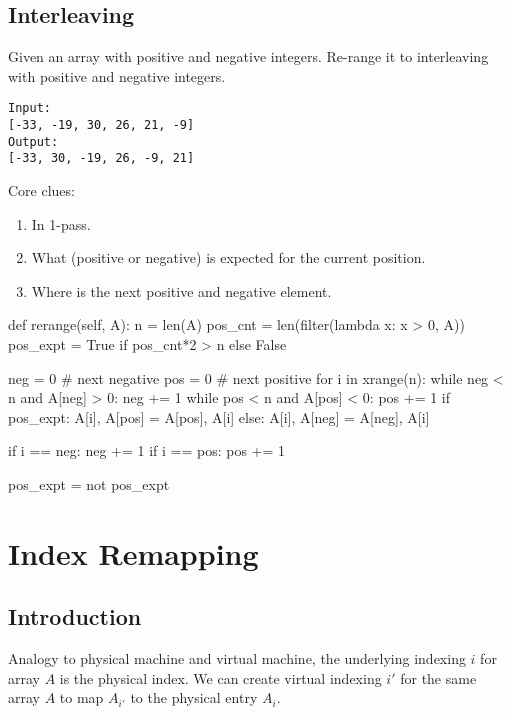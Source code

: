 \subsection{Interleaving}
 Given an array with positive and negative integers. Re-range it to interleaving with positive and negative integers.
\begin{lstlisting}
Input:
[-33, -19, 30, 26, 21, -9]
Output:
[-33, 30, -19, 26, -9, 21]
\end{lstlisting}
Core clues:
\begin{enumerate}
\item In 1-pass.
\item What (positive or negative) is expected for the current position.
\item Where is the next positive and negative element.
\end{enumerate}
\begin{python}
def rerange(self, A):
    n = len(A)
    pos_cnt = len(filter(lambda x: x > 0, A))
    pos_expt = True if pos_cnt*2 > n else False

    neg = 0  # next negative
    pos = 0  # next positive
    for i in xrange(n):
        while neg < n and A[neg] > 0: neg += 1
        while pos < n and A[pos] < 0: pos += 1
        if pos_expt:
            A[i], A[pos] = A[pos], A[i]
        else:
            A[i], A[neg] = A[neg], A[i]

        if i == neg: neg += 1
        if i == pos: pos += 1

        pos_expt = not pos_expt
\end{python}

\section{Index Remapping}
\subsection{Introduction}
 Analogy to physical machine and virtual machine, the underlying indexing $i$ for array $A$ is the physical index. We can create virtual indexing $i'$ for the same array $A$ to map $A_{i'}$ to the physical entry $A_{i}$.
